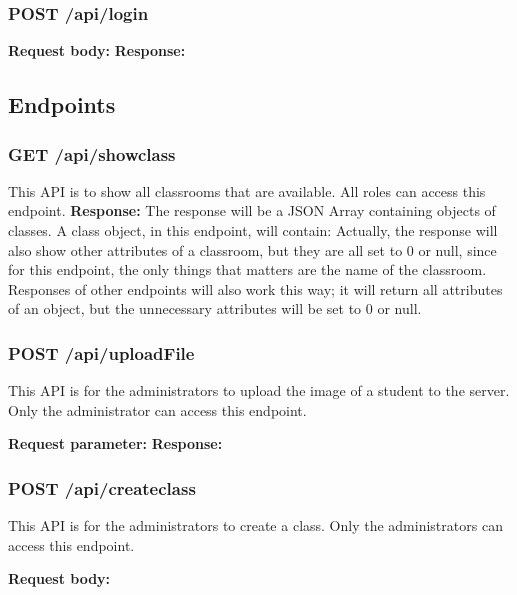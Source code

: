 \documentclass[a4paper, 11pt,openany]{book} %
\begin{document}
\subsubsection{POST /api/login}
\textbf{Request body:}
\textbf{Response:}

\subsection{Endpoints}
\subsubsection{GET /api/showclass}
This API is to show all classrooms that are available. All roles can access this endpoint.
\textbf{Response:}
The response will be a JSON Array containing objects of classes. A class object, in this endpoint, will contain:
Actually, the response will also show other attributes of a classroom, but they are all set to 0 or null, since for this endpoint, the only things that matters are the name of the classroom. Responses of other endpoints will also work this way; it will return all attributes of an object, but the unnecessary attributes will be set to 0 or null.

\subsubsection{POST /api/uploadFile}
This API is for the administrators to upload the image of a student to the server. Only the administrator can access this endpoint.\par
\textbf{Request parameter:}
\textbf{Response:}
\subsubsection{POST /api/createclass}
This API is for the administrators to create a class. Only the administrators can access this endpoint. \par
\textbf{Request body:}
\end{document}
